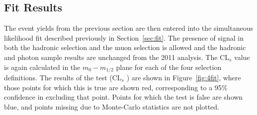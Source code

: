 \subsection{Fit Results}

The event yields from the previous section are then entered into the simultaneous likelihood fit described previously in Section~\ref{sec:fit}. The presence of signal in both the hadronic selection and the muon selection is allowed and the hadronic and photon sample results are unchanged from the 2011 analysis. The CL$_{s}$ value is again calculated in the $m_{0}-m_{1/2}$ plane for each of the four selection definitions. The results of the test (CL$_{s}$ ) are shown in Figure~\ref{fig:4fit}, where those points for which this is true are shown red, corresponding to a 95\% confidence in excluding that point. Points for which the test is false are shown blue, and points missing due to Monte-Carlo statistics are not plotted. 



